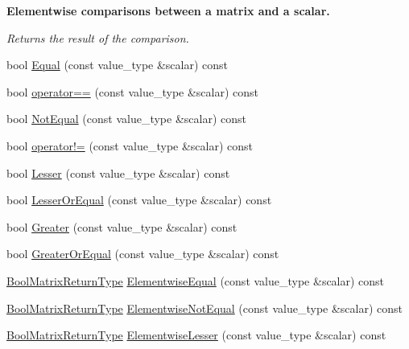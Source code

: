 \begin{Indent}{\bf Elementwise comparisons between a matrix and a scalar.}\par
{\em Returns the result of the comparison. }\begin{DoxyCompactItemize}
\item 
bool \hyperlink{classvct_dynamic_const_matrix_base_a0ea11bd3f6b9acfc8cca4fe258f64775}{Equal} (const value\-\_\-type \&scalar) const 
\item 
bool \hyperlink{classvct_dynamic_const_matrix_base_a6d8f173aff05e29546051d581b2b1c80}{operator==} (const value\-\_\-type \&scalar) const 
\item 
bool \hyperlink{classvct_dynamic_const_matrix_base_a8c6946705498c804915af7c7e976601c}{Not\-Equal} (const value\-\_\-type \&scalar) const 
\item 
bool \hyperlink{classvct_dynamic_const_matrix_base_a82165bf37eeaded8c79e2342c4423e8e}{operator!=} (const value\-\_\-type \&scalar) const 
\item 
bool \hyperlink{classvct_dynamic_const_matrix_base_af185172c44ddcd88ca122bb4dff87f6e}{Lesser} (const value\-\_\-type \&scalar) const 
\item 
bool \hyperlink{classvct_dynamic_const_matrix_base_a4cd753140d62da0dc24632c5cea5c17e}{Lesser\-Or\-Equal} (const value\-\_\-type \&scalar) const 
\item 
bool \hyperlink{classvct_dynamic_const_matrix_base_ae7f3ff39f81672610a66d153ee3a3e34}{Greater} (const value\-\_\-type \&scalar) const 
\item 
bool \hyperlink{classvct_dynamic_const_matrix_base_a0c1a858c74218da042fe24fec7e6596c}{Greater\-Or\-Equal} (const value\-\_\-type \&scalar) const 
\item 
\hyperlink{classvct_dynamic_const_matrix_base_ac71d88dda7abaaeb2276b83f2e49def7}{Bool\-Matrix\-Return\-Type} \hyperlink{classvct_dynamic_const_matrix_base_a3b17221784161d1778334a56b31fa8a8}{Elementwise\-Equal} (const value\-\_\-type \&scalar) const 
\item 
\hyperlink{classvct_dynamic_const_matrix_base_ac71d88dda7abaaeb2276b83f2e49def7}{Bool\-Matrix\-Return\-Type} \hyperlink{classvct_dynamic_const_matrix_base_a645b23e25d28049e92e4d192e19e42e7}{Elementwise\-Not\-Equal} (const value\-\_\-type \&scalar) const 
\item 
\hyperlink{classvct_dynamic_const_matrix_base_ac71d88dda7abaaeb2276b83f2e49def7}{Bool\-Matrix\-Return\-Type} \hyperlink{classvct_dynamic_const_matrix_base_a515d379cc1fa0088de2ea36f9b5c0f86}{Elementwise\-Lesser} (const value\-\_\-type \&scalar) const 

\end{DoxyCompactItemize}
\end{Indent}
